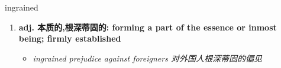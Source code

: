 
\begin{frame}
{\huge ingrained}
\begin{center}
\begin{enumerate}\Large
  \item \textbf{adj. 本质的,根深蒂固的: forming a part of the essence or inmost being; firmly established}
  \begin{itemize}
    \item \em{\Large{ingrained prejudice against foreigners 对外国人根深蒂固的偏见}}
  \end{itemize}
\end{enumerate}
\end{center}
\end{frame}
